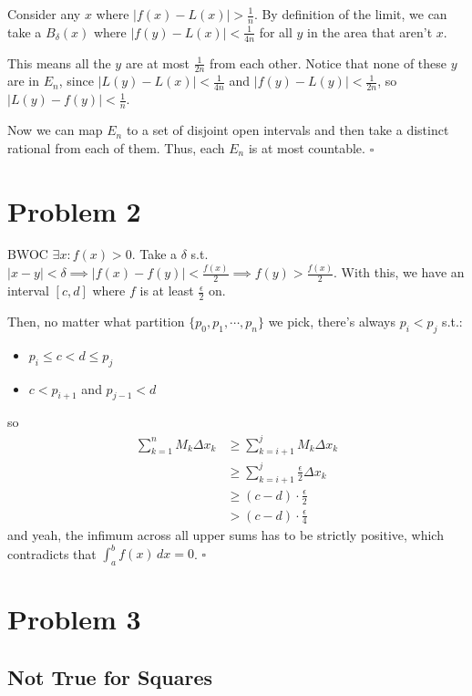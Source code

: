 \documentclass[12pt]{article}
\begin{document}
Consider any $x$ where $|f(x)-L(x)| > \frac{1}{n}$.
By definition of the limit, we can take a $B_\delta(x)$
where $|f(y)-L(x)| < \frac{1}{4n}$ for all $y$ in the area that aren't $x$.

This means all the $y$ are at most $\frac{1}{2n}$ from each other.
Notice that none of these $y$ are in $E_n$, since $|L(y)-L(x)| < \frac{1}{4n}$
and $|f(y)-L(y)| < \frac{1}{2n}$, so $|L(y)-f(y)| < \frac{1}{n}$.

Now we can map $E_n$ to a set of disjoint open intervals
and then take a distinct rational from each of them.
Thus, each $E_n$ is at most countable. $\square$

\pagebreak

\section{Problem 2}

BWOC $\exists x: f(x) > 0$.
Take a $\delta$ s.t. $|x-y| < \delta \implies |f(x)-f(y)| < \frac{f(x)}{2} \implies f(y) > \frac{f(x)}{2}$.
With this, we have an interval $[c, d]$ where $f$ is at least $\frac{\epsilon}{2}$ on.

Then, no matter what partition $\{p_0, p_1, \cdots, p_n\}$
we pick, there's always $p_i < p_j$ s.t.:
\begin{itemize}[nolistsep]
  \item $p_i \le c < d \le p_j$
  \item $c < p_{i+1}$ and $p_{j-1} < d$
\end{itemize}
so
\begin{align*}
  \sum_{k=1}^{n} M_k \Delta x_k
   & \ge \sum_{k=i+1}^{j} M_k \Delta x_k                \\
   & \ge \sum_{k=i+1}^{j} \frac{\epsilon}{2} \Delta x_k \\
   & \ge (c-d) \cdot \frac{\epsilon}{2}                 \\
   & > (c-d) \cdot \frac{\epsilon}{4}
\end{align*}
and yeah, the infimum across all upper sums has to be strictly positive,
which contradicts that $\int_{a}^{b} f(x)\,dx=0$. $\square$

\pagebreak

\section{Problem 3}

\subsection{Not True for Squares}
\end{document}
